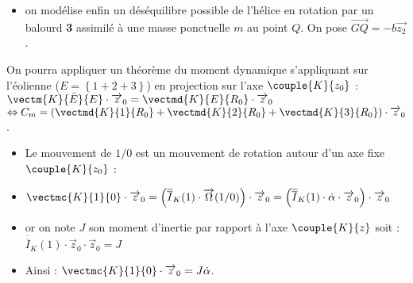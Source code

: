 \begin{multicols}{2}
\begin{itemize}
\item on modélise enfin un déséquilibre possible de l'hélice en rotation par un balourd \textbf{3} assimilé à une masse ponctuelle $m$ au point $Q$. On pose $\overrightarrow{GQ}=-b\overrightarrow{z_2}$.
\end{itemize}

\fi

\ifprof
\begin{corrige}

\end{corrige}
\else
\fi


\ifprof
\begin{corrige}
On pourra appliquer un théorème du moment dynamique s'appliquant sur l'éolienne ($E=\left\{1+2+3\right\}$) en projection sur l'axe $\couple{K}{{z}_0}$  : 
$\vectm{K}{\bar E}{E}\cdot \overrightarrow{z}_0=\vectmd{K}{E}{R_0}\cdot \overrightarrow{z}_0$
$\Leftrightarrow
C_m=\left(\vectmd{K}{1}{R_0}+\vectmd{K}{2}{R_0}+\vectmd{K}{3}{R_0}\right)\cdot \overrightarrow{z}_0$.
\end{corrige}
\else
\fi


\ifprof
\begin{corrige}
\begin{itemize}
\item Le mouvement de $1/0$ est un mouvement de rotation autour d'un axe fixe $\couple{K}{{z}_0}$ : 

\item $\vectmc{K}{1}{0}\cdot \overrightarrow{z}_0=\left(\overline{\overline{I}}_K(1)\cdot \overrightarrow{\Omega}(1/0)\right)\cdot \overrightarrow{z}_0=\left(\overline{\overline{I}}_K(1)\cdot \dot{\alpha}\cdot \overrightarrow{z}_0 \right)\cdot \overrightarrow{z}_0$

\item or on note $J$ son moment d'inertie par rapport à l'axe $\couple{K}{{z}}$ soit : 
$
\overline{\overline{I}}_K(1)\cdot\overrightarrow{z}_0\cdot \overrightarrow{z}_0=J
$

\item Ainsi : 
$
\vectmc{K}{1}{0}\cdot \overrightarrow{z}_0=J \dot{\alpha}
$.
\end{itemize}
\end{corrige}
\else
\fi



\end{multicols}
